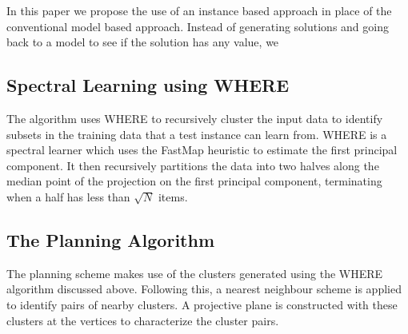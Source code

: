 \documentclass[conference]{IEEEtran}
\begin{document}
In this paper we propose the use of an instance based approach in place of the conventional model based approach. Instead of generating solutions and going back to a model to see if the solution has any value, we 

\subsection{Spectral Learning using WHERE}
The algorithm uses WHERE to recursively cluster the input data to identify subsets in the training data that a test instance can learn from. WHERE is a spectral learner which uses the FastMap heuristic to estimate the first principal component. It then recursively partitions the data into two halves along the median point of the projection on the first principal component, terminating when a half has less than $\sqrt{N}$ items.   

\subsection{The Planning Algorithm}
The planning scheme makes use of the clusters generated using the WHERE algorithm discussed above. Following this, a nearest neighbour scheme is applied to identify pairs of nearby clusters. A projective plane is constructed with these clusters at the vertices to characterize the cluster pairs.
\end{document}
